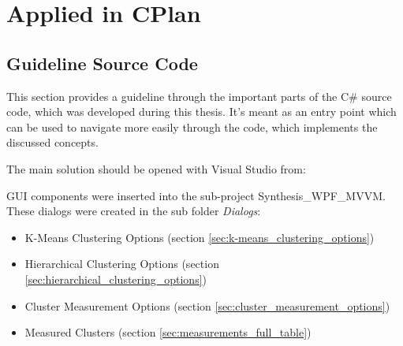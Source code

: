 \appendix
\chapter{Applied in CPlan}
\section{Guideline Source Code}
This section provides a guideline through the important parts of the C\# source code, which was developed during this thesis. It's meant as an entry point which can be used to navigate more easily through the code, which implements the discussed concepts.

The main solution should be opened with Visual Studio from: 

\gls{GUI} components were inserted into the sub-project Synthesis\_WPF\_MVVM. These dialogs were created in the sub folder \textit{Dialogs}:

\begin{itemize}
    \item K-Means Clustering Options (section \ref{sec:k-means_clustering_options})
    \item Hierarchical Clustering Options (section \ref{sec:hierarchical_clustering_options})
    \item Cluster Measurement Options (section \ref{sec:cluster_measurement_options})
    \item Measured Clusters (section \ref{sec:measurements_full_table})
\end{itemize}

